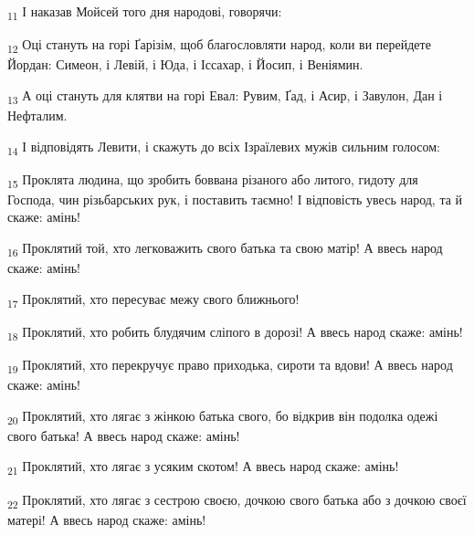 \begin{tcolorbox}
\textsubscript{11} І наказав Мойсей того дня народові, говорячи:
\end{tcolorbox}
\begin{tcolorbox}
\textsubscript{12} Оці стануть на горі Ґарізім, щоб благословляти народ, коли ви перейдете Йордан: Симеон, і Левій, і Юда, і Іссахар, і Йосип, і Веніямин.
\end{tcolorbox}
\begin{tcolorbox}
\textsubscript{13} А оці стануть для клятви на горі Евал: Рувим, Ґад, і Асир, і Завулон, Дан і Нефталим.
\end{tcolorbox}
\begin{tcolorbox}
\textsubscript{14} І відповідять Левити, і скажуть до всіх Ізраїлевих мужів сильним голосом:
\end{tcolorbox}
\begin{tcolorbox}
\textsubscript{15} Проклята людина, що зробить боввана різаного або литого, гидоту для Господа, чин різьбарських рук, і поставить таємно! І відповість увесь народ, та й скаже: амінь!
\end{tcolorbox}
\begin{tcolorbox}
\textsubscript{16} Проклятий той, хто легковажить свого батька та свою матір! А ввесь народ скаже: амінь!
\end{tcolorbox}
\begin{tcolorbox}
\textsubscript{17} Проклятий, хто пересуває межу свого ближнього!
\end{tcolorbox}
\begin{tcolorbox}
\textsubscript{18} Проклятий, хто робить блудячим сліпого в дорозі! А ввесь народ скаже: амінь!
\end{tcolorbox}
\begin{tcolorbox}
\textsubscript{19} Проклятий, хто перекручує право приходька, сироти та вдови! А ввесь народ скаже: амінь!
\end{tcolorbox}
\begin{tcolorbox}
\textsubscript{20} Проклятий, хто лягає з жінкою батька свого, бо відкрив він подолка одежі свого батька! А ввесь народ скаже: амінь!
\end{tcolorbox}
\begin{tcolorbox}
\textsubscript{21} Проклятий, хто лягає з усяким скотом! А ввесь народ скаже: амінь!
\end{tcolorbox}
\begin{tcolorbox}
\textsubscript{22} Проклятий, хто лягає з сестрою своєю, дочкою свого батька або з дочкою своєї матері! А ввесь народ скаже: амінь!
\end{tcolorbox}
